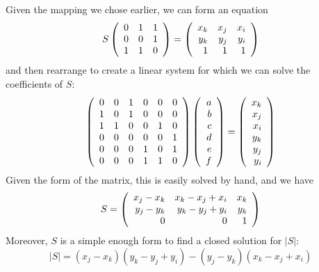 Given the mapping we chose earlier, we can form an equation
\begin{equation}
S \left(\begin{array}{rrrrrr}  0 & 1 & 1 \\ 0 & 0 & 1 \\ 1 & 1 & 0  \\ \end{array} \right)
= \left(\begin{array}{rrrrrr}  x_k & x_j & x_i \\ y_k & y_j & y_i \\ 1 & 1 & 1 \\ \end{array} \right)
\end{equation}
and then rearrange to create a linear system for which we can solve the coefficients of $S$:
\begin{equation}
\left(\begin{array}{rrrrrr} 
    0 & 0 & 1 & 0 & 0 & 0 \\
    1 & 0 & 1 & 0 & 0 & 0 \\
    1 & 1 & 0 & 0 & 1 & 0 \\
    0 & 0 & 0 & 0 & 0 & 1 \\
    0 & 0 & 0 & 1 & 0 & 1 \\
    0 & 0 & 0 & 1 & 1 & 0 
 \\ \end{array} \right)
\left(\begin{array}{rrrrrr} a \\ b \\ c \\ d \\ e \\ f \\ \end{array} \right)
=
\left(\begin{array}{rrrrrr} x_k \\ x_j \\ x_i \\ y_k \\ y_j \\ y_i  \\ \end{array} \right)
\end{equation}
Given the form of the matrix, this is easily solved by hand, and we have
\begin{equation}
S = \left(\begin{array}{rrrrrr} 
    x_j - x_k & x_k - x_j + x_i & x_k \\
    y_j - y_k & y_k - y_j + y_i & y_k \\
    0 & 0 & 1
 \\ \end{array} \right)
\end{equation}
Moreover, $S$ is a simple enough form to find a closed solution for $|S|$:
\begin{equation}
|S| = 
(x_j - x_k)(y_k - y_j + y_i) -
(y_j - y_k)(x_k - x_j + x_i)
\end{equation}

